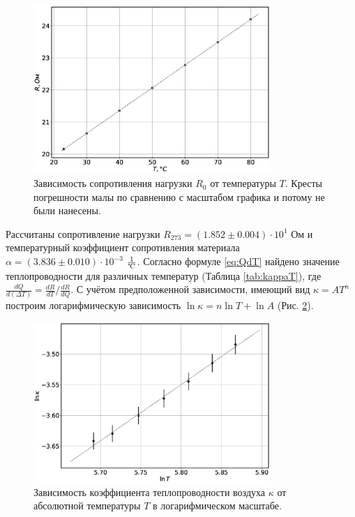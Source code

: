 \documentclass[12pt]{article}
\begin{document}
\begin{figure}[H]
    \centering
    \includegraphics[width=0.8\textwidth]{RT.eps}
    \caption{Зависимость сопротивления нагрузки \(R_0\) от температуры \(T\). Кресты погрешности малы по сравнению с масштабом графика и потому не были нанесены.}
    \label{fig:RT}
\end{figure}
Рассчитаны сопротивление нагрузки \(R_{273} = (1.852 \pm 0.004) \cdot 10 ^ {1}\) Ом и температурный коэффициент сопротивления материала 
\(\alpha = (3.836 \pm 0.010) \cdot 10 ^ {-3} \) \(\frac{1}{\textrm{\textcelsius}}\).
Согласно формуле \ref{eq:QdT} найдено значение теплопроводности для различных температур (Таблица \ref{tab:kappaT}), где \(\frac{d Q}{d (\Delta T)} = \frac{d R}{d T} / \frac{d R}{d Q}\).
С учётом предположенной зависимости, имеющий вид \(\kappa = A T^{n} \) построим логарифмическую зависимость \(\ln \kappa = n \ln T + \ln A\) (Рис. \ref{fig:lnkT}).   
\begin{figure}[H]
    \centering
    \includegraphics[width=0.8\textwidth]{lnkT.eps}
    \caption{Зависимость коэффициента теплопроводности воздуха \(\kappa \) от абсолютной температуры \(T\) в логарифмическом масштабе.}
    \label{fig:lnkT}
\end{figure}
\end{document}
